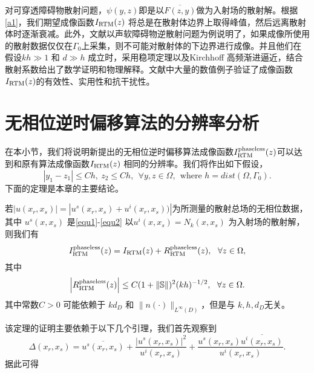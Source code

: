 \begin{remark}
对可穿透障碍物散射问题，$\psi(y,z)$即是以$\overline{F(z,y)}$做为入射场的散射解。根据\eqref{a1}，我们期望成像函数$I_{\rm RTM}(z)$ 将总是在散射体边界上取得峰值，然后远离散射体时逐渐衰减。此外，文献\cite{ch_ha}以声软障碍物逆散射问题为例说明了，如果成像所使用的散射数据仅仅在$\Gamma_0$上采集，则不可能对散射体的下边界进行成像。并且他们在假设$kh\gg1$ 和 $d\gg h$ 成立时，采用稳项定理以及Kirchhoff 高频渐进逼近，结合散射系数给出了数学证明和物理解释。文献\cite{ch_ha}中大量的数值例子验证了成像函数$I_{\rm RTM}(z)$的有效性、实用性和抗干扰性。
\end{remark}
\section{无相位逆时偏移算法的分辨率分析}
在本小节，我们将说明新提出的无相位逆时偏移算法成像函数$I^{\rm phaseless}_{\rm RTM}(z)$可以达到和原有算法成像函数$I_{\rm RTM}(z)$ 相同的分辨率。我们将作出如下假设，
\begin{equation}\label{ass}
|y_1-z_1|\leq Ch,\ z_2\leq Ch,\ \ \forall y,z\in\Omega,\ \ \mbox{where }h=dist(\Omega,\Gamma_0).
\end{equation}
下面的定理是本章的主要结论。
\begin{theorem}[无相位逆时偏移算法的分辨率分析]\label{main}
 若$|u(x_r,x_s)|=|u^s(x_r,x_s)+u^i(x_r,x_s))|$为所测量的散射总场的无相位数据，其中 $u^s(x,x_s)$ 是\eqref{equ1}-\eqref{equ2} 以$u^i(x,x_s)=N_k(x,x_s)$ 为入射场的散射解，则我们有
\begin{equation*}
  I^{\rm phaseless}_{\rm RTM}(z)=I_{\rm RTM}(z)+ R^{\rm phaseless}_{\rm RTM}(z),\ \ \forall z\in\Omega,
\end{equation*}
其中
\begin{equation*}
\left| R^{\rm phaseless}_{\rm RTM}(z)\right|\leq C(1 + \|\mathbb{S}\|)^2(kh)^{-1/2},\ \ \forall z\in\Omega.
\end{equation*}
其中常数$C>0$ 可能依赖于 $kd_D$ 和 $\|n(\cdot)\|_{L^{\infty}(D)}$，但是与 $k,h,d_D$无关。
\end{theorem}
该定理的证明主要依赖于以下几个引理，我们首先观察到
\begin{equation*}
  \Delta(x_r,x_s)=\overline{u^s(x_r,x_s)}+\frac{|u^s(x_r,x_s)|^2}{u^i(x_r,x_s)}+\frac{u^s(x_r,x_s)
  \overline{u^i(x_r,x_s)}}{u^i(x_r,x_s)}.
\end{equation*}
据此可得
